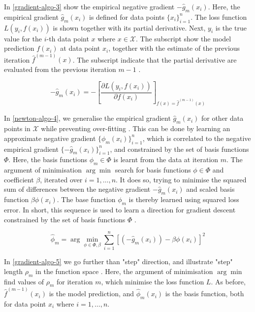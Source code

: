 In \autoref{gradient-algo-3} \textcite{ntnu-thesis-why-does-xgboost-win-every-machine-learning-competition} show the empirical negative gradient $-\hat{g}_m(x_i)$. Here, the empirical gradient $\hat{g}_m(x_i)$ is defined for data points $\{x_i\}_{i=1}^{n}$. The loss function $L(y_i,f(x_i))$ is shown together with its partial derivative. Next, $y_i$ is the true value for the $i$-th data point $x$ where $x\in\mathcal{X}$. The subscript show the model prediction $f(x_i)$ at data point $x_i$, together with the estimate of the previous iteration $\hat{f}^{(m-1)}(x)$. The subscript indicate that the partial derivative are evaluated from the previous iteration $m-1$ \parencite{ntnu-thesis-why-does-xgboost-win-every-machine-learning-competition}. 

\vspace{-1em}
\begin{equation}
\label{gradient-algo-3}
    -\hat{g}_{m}(x_i) = -\left[\frac{\partial L(y_i, f(x_i))}{\partial f(x_i)} \right]_{f(x)=\hat{f}^{(m-1)}(x)}
\end{equation}

In \autoref{newton-algo-4}, we generalise the empirical gradient $\hat{g}_m(x_i)$ for other data points in $\mathcal{X}$ while preventing over-fitting \parencite{ntnu-thesis-why-does-xgboost-win-every-machine-learning-competition}. This can be done by learning an approximate negative gradient $\{\phi_m(x_i)\}_{i=1}^{n}$, which is correlated to the negative empirical gradient $\{-\hat{g}_m(x_i)\}_{i=1}^{n}$, and constrained by the set of basis functions $\Phi$. Here, the basis functions $\phi_m\in\Phi$ is learnt from the data at iteration $m$. The argument of minimisation $\arg\min$ search for basis functions $\phi\in\Phi$ and coefficient $\beta$, iterated over $i=1,\dots,n$. It does so, trying to minimise the squared sum of differences between the negative gradient $-\hat{g}_m(x_i)$ and scaled basis function $\beta\phi(x_i)$. The base function $\phi_m$ is thereby learned using squared loss error. In short, this sequence is used to learn a direction for gradient descent constrained by the set of basis functions $\Phi$ \parencite{ntnu-thesis-why-does-xgboost-win-every-machine-learning-competition}.  

\begin{equation}
\label{gradient-algo-4}
\hat{\phi}_m=\arg\min_{\phi\in\Phi,\beta}\sum_{i=1}^{n}\left[ (-\hat{g}_{m}(x_i)) - \beta\phi(x_i) \right]^2
\end{equation}

In \autoref{gradient-algo-5} we go further than "step" direction, and illustrate "step" length $\rho_m$ in the function space \parencite{ntnu-thesis-why-does-xgboost-win-every-machine-learning-competition}. Here, the argument of minimisation $\arg\min$ find values of $\rho_m$ for iteration $m$, which minimise the loss function $L$. As before, $\hat{f}^{(m-1)}(x_i)$ is the model prediction, and $\hat{\phi}_m(x_i)$ is the basis function, both for data point $x_i$ where $i=1,\dots,n$.  

